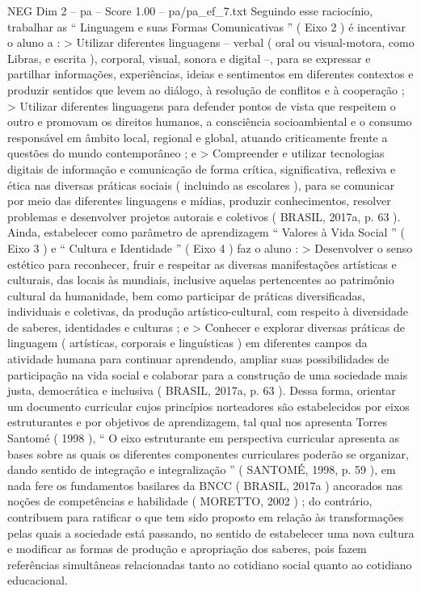 \begin{textsample}{NEG Dim 2 – pa – Score 1.00 – pa/pa\_ef\_7.txt}
Seguindo esse raciocínio, trabalhar as “ Linguagem e suas Formas Comunicativas ” ( Eixo 2 ) é incentivar o aluno a : > Utilizar diferentes linguagens – verbal ( oral ou visual-motora, como Libras, e escrita ), corporal, visual, sonora e digital –, para se expressar e partilhar informações, experiências, ideias e sentimentos em diferentes contextos e produzir sentidos que levem ao diálogo, à resolução de conflitos e à cooperação ; > Utilizar diferentes linguagens para defender pontos de vista que respeitem o outro e promovam os direitos humanos, a consciência socioambiental e o consumo responsável em âmbito local, regional e global, atuando criticamente frente a questões do mundo contemporâneo ; e > Compreender e utilizar tecnologias digitais de informação e comunicação de forma crítica, significativa, reflexiva e ética nas diversas práticas sociais ( incluindo as escolares ), para se comunicar por meio das diferentes linguagens e mídias, produzir conhecimentos, resolver problemas e desenvolver projetos autorais e coletivos ( BRASIL, 2017a, p. 63 ).
Ainda, estabelecer como parâmetro de aprendizagem “ Valores à Vida Social ” ( Eixo 3 ) e “ Cultura e Identidade ” ( Eixo 4 ) faz o aluno : > Desenvolver o senso estético para reconhecer, fruir e respeitar as diversas manifestações artísticas e culturais, das locais às mundiais, inclusive aquelas pertencentes ao patrimônio cultural da humanidade, bem como participar de práticas diversificadas, individuais e coletivas, da produção artístico-cultural, com respeito à diversidade de saberes, identidades e culturas ; e > Conhecer e explorar diversas práticas de linguagem ( artísticas, corporais e linguísticas ) em diferentes campos da atividade humana para continuar aprendendo, ampliar suas possibilidades de participação na vida social e colaborar para a construção de uma sociedade mais justa, democrática e inclusiva ( BRASIL, 2017a, p. 63 ).
Dessa forma, orientar um documento curricular cujos princípios norteadores são estabelecidos por eixos estruturantes e por objetivos de aprendizagem, tal qual nos apresenta Torres Santomé ( 1998 ), “ O eixo estruturante em perspectiva curricular apresenta as bases sobre as quais os diferentes componentes curriculares poderão se organizar, dando sentido de integração e integralização ” ( SANTOMÉ, 1998, p. 59 ), em nada fere os fundamentos basilares da BNCC ( BRASIL, 2017a ) ancorados nas noções de competências e habilidade ( MORETTO, 2002 ) ; do contrário, contribuem para ratificar o que tem sido proposto em relação às transformações pelas quais a sociedade está passando, no sentido de estabelecer uma nova cultura e modificar as formas de produção e apropriação dos saberes, pois fazem referências simultâneas relacionadas tanto ao cotidiano social quanto ao cotidiano educacional.

\end{textsample}
